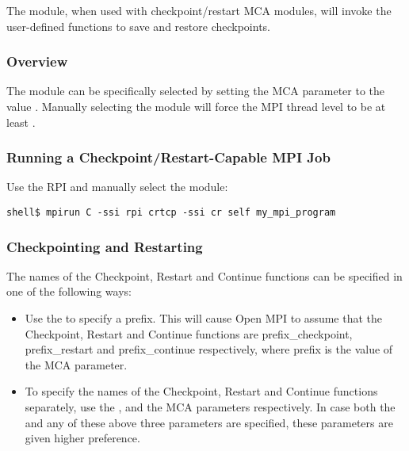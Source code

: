 The  module, when used with checkpoint/restart MCA modules, will 
invoke the user-defined functions to save and restore checkpoints.


\subsubsection{Overview}

The  module can be specifically selected by setting the 
 MCA parameter to the value .  Manually 
selecting the  module will force the MPI thread level to be at 
least .


\subsubsection{Running a Checkpoint/Restart-Capable MPI Job}

Use the  RPI and manually select the  module:

\lstset{style=lam-cmdline}
\begin{lstlisting}
shell$ mpirun C -ssi rpi crtcp -ssi cr self my_mpi_program
\end{lstlisting}

 
\subsubsection{Checkpointing and Restarting}

The names of the Checkpoint, Restart and Continue functions can be specified 
in one of the following ways:

\begin{itemize}
  \item Use the  to specify a prefix.  This will 
    cause Open MPI to assume that the Checkpoint, Restart and Continue functions 
    are prefix\_checkpoint, prefix\_restart and prefix\_continue respectively, 
    where prefix is the value of the  MCA parameter.

  \item To specify the names of the Checkpoint, Restart and Continue functions 
    separately, use the , 
     and the 
     MCA parameters respectively.  In 
    case both the  and any of these 
    above three parameters are specified, these parameters are given higher preference. 


\end{itemize}

